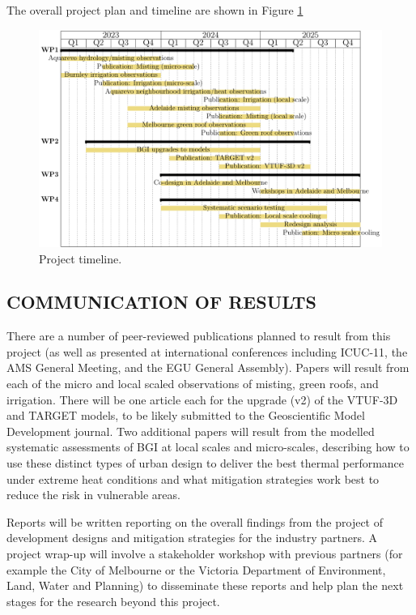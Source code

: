 The overall project plan and timeline are shown in Figure \ref{fig:timeline}

\begin{figure}[ht]
\centering
\includegraphics[scale=0.70]{DECRA-D-timeline.pdf}
\caption{Project timeline. }
\label{fig:timeline}
\end{figure}


\subsection*{\TitleFont COMMUNICATION OF RESULTS}


There are a number of peer-reviewed publications planned to result from this project (as well as presented at international conferences including ICUC-11, the AMS General Meeting, and the EGU General Assembly). Papers will result from each of the micro and local scaled observations of misting, green roofs, and irrigation. There will be one article each for the upgrade (v2) of the VTUF-3D and TARGET models, to be likely submitted to the Geoscientific Model Development journal. Two additional papers will result from the modelled systematic assessments of BGI at local scales and micro-scales, describing how to use these distinct types of urban design to deliver the best thermal performance under extreme heat conditions and what mitigation strategies work best to reduce the risk in vulnerable areas.

Reports will be written reporting on the overall findings from the project of development designs and mitigation strategies for the industry partners. A project wrap-up will involve a stakeholder workshop with previous partners (for example the City of Melbourne or the Victoria Department of Environment, Land, Water and Planning) to disseminate these reports and help plan the next stages for the research beyond this project.

